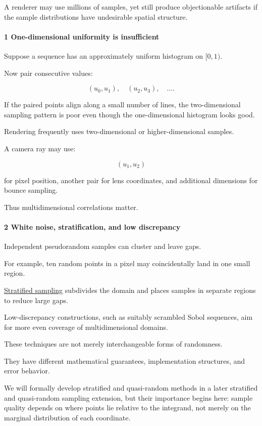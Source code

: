 A renderer may use millions of samples, yet still produce objectionable artifacts if the sample distributions have undesirable spatial structure.

\paragraph{1 One-dimensional uniformity is insufficient}\label{one-dimensional-uniformity-is-insufficient}

Suppose a sequence has an approximately uniform histogram on \([0,1)\).

Now pair consecutive values:

\[
 (u_0,u_1),\quad(u_2,u_3),\quad\ldots.
\]

If the paired points align along a small number of lines, the two-dimensional sampling pattern is poor even though the one-dimensional histogram looks good.

Rendering frequently uses two-dimensional or higher-dimensional samples.

A camera ray may use:

\[
 (u_1,u_2)
\]

for pixel position, another pair for lens coordinates, and additional dimensions for bounce sampling.

Thus multidimensional correlations matter.

\paragraph{2 White noise, stratification, and low discrepancy}\label{white-noise-stratification-and-low-discrepancy}

Independent pseudorandom samples can cluster and leave gaps.

For example, ten random points in a pixel may coincidentally land in one small region.

\hyperref[02-foundations-ii-ch029]{Stratified sampling} subdivides the domain and places samples in separate regions to reduce large gaps.

Low-discrepancy constructions, such as suitably scrambled Sobol sequences, aim for more even coverage of multidimensional domains.

These techniques are not merely interchangeable forms of randomness.

They have different mathematical guarantees, implementation structures, and error behavior.

We will formally develop stratified and quasi-random methods in a later stratified and quasi-random sampling extension, but their importance begins here: sample quality depends on where points lie relative to the integrand, not merely on the marginal distribution of each coordinate.

